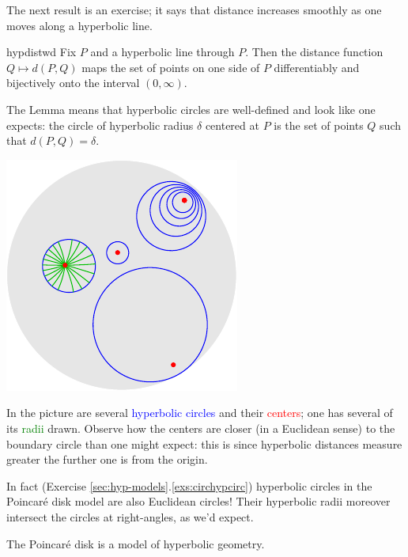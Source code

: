 \begin{minipage}[t]{0.65\linewidth}\vspace{-5pt}
The next result is an exercise; it says that distance increases smoothly as one moves along a hyperbolic line.

\begin{lemm}{}{hypdistwd}
Fix $P$ and a hyperbolic line through $P$. Then the distance function $Q\mapsto d(P,Q)$ maps the set of points on one side of $P$ differentiably and bijectively onto the interval $(0,\infty)$.
\end{lemm}

The Lemma means that hyperbolic circles are well-defined and look like one expects: the circle of hyperbolic radius $\delta$ centered at $P$ is the set of points $Q$ such that $d(P,Q)=\delta$.
\end{minipage}\hfill\begin{minipage}[t]{0.35\linewidth}\vspace{-5pt}
\flushright\includegraphics[scale=0.95]{hyper-circle}
\end{minipage}\medbreak

In the picture are several \textcolor{blue}{hyperbolic circles} and their \textcolor{red}{centers}; one has several of its \textcolor{Green}{radii} drawn. Observe how the centers are closer (in a Euclidean sense) to the boundary circle than one might expect: this is since hyperbolic distances measure greater the further one is from the origin.\smallbreak

In fact (Exercise \ref*{sec:hyp-models}.\ref{exs:circhypcirc}) hyperbolic circles in the Poincaré disk model are also Euclidean circles! Their hyperbolic radii moreover intersect the circles at right-angles, as we'd expect.


\begin{thm}{}{}
The Poincaré disk is a model of hyperbolic geometry.
\end{thm}

